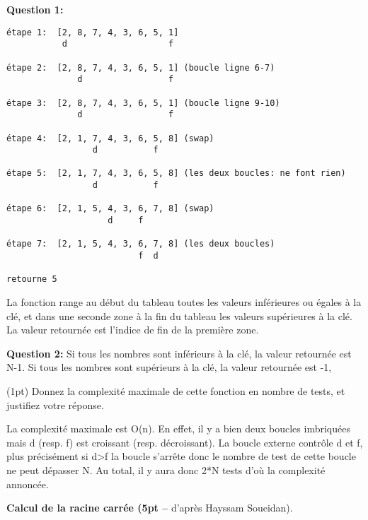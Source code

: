 \documentclass[10pt]{article}\usepackage[nu]{esial}
\begin{document}
\begin{Reponse}
\noindent\textbf{Question 1:} 
\begin{Verbatim}[numbers=none]
étape 1:  [2, 8, 7, 4, 3, 6, 5, 1]
           d                    f

étape 2:  [2, 8, 7, 4, 3, 6, 5, 1] (boucle ligne 6-7)
              d                 f

étape 3:  [2, 8, 7, 4, 3, 6, 5, 1] (boucle ligne 9-10)
              d                 f

étape 4:  [2, 1, 7, 4, 3, 6, 5, 8] (swap)
                 d           f    

étape 5:  [2, 1, 7, 4, 3, 6, 5, 8] (les deux boucles: ne font rien)
                 d           f

étape 6:  [2, 1, 5, 4, 3, 6, 7, 8] (swap)
                    d     f   

étape 7:  [2, 1, 5, 4, 3, 6, 7, 8] (les deux boucles)
                          f  d 

retourne 5
\end{Verbatim}


La fonction range au début du tableau toutes les valeurs inférieures ou égales à
la clé, et dans une seconde zone à la fin du tableau les valeurs supérieures à
la clé. La valeur retournée est l'indice de fin de la première zone.


\noindent\textbf{Question 2:} 
Si tous les nombres sont inférieurs à la clé, la valeur retournée est N-1. Si tous les nombres sont
supérieurs à la clé, la valeur retournée est -1,
\end{Reponse}

\Question(1pt) Donnez la complexité maximale de cette fonction en nombre de tests, et
justifiez votre réponse.
\begin{Reponse}
  La complexité maximale est O(n). En effet, il y a bien deux boucles
  imbriquées mais d (resp. f) est croissant (resp. décroissant). La boucle
  externe contrôle d et f, plus précisément si d>f la boucle s'arrête donc le
  nombre de test de cette boucle ne peut dépasser N. Au total, il y aura donc
  2*N tests d'où la complexité annoncée.
\end{Reponse}

\Exercice \textbf{Calcul de la racine carrée (5pt -- } d'après Hayssam Soueidan).
\end{document}
